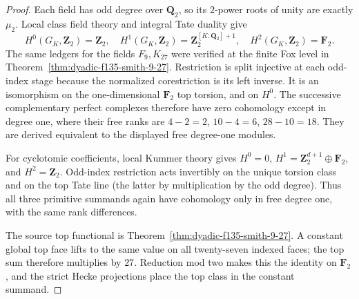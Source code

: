 \begin{proof}
Each field
has odd degree
over $\mathbf Q_2$,
so its
$2$-power roots
of unity are
exactly $\mu_2$.
Local class field
theory and
integral Tate
duality give
\[
H^0(G_K,\mathbf Z_2)=\mathbf Z_2,\quad
H^1(G_K,\mathbf Z_2)
=\mathbf Z_2^{[K:\mathbf Q_2]+1},\quad
H^2(G_K,\mathbf Z_2)=\mathbf F_2.
\]
The same ledgers
for the fields
$F_9,K_{27}$
were verified
at the finite
Fox level in
Theorem~\ref{thm:dyadic-f135-smith-9-27}.
Restriction is
split injective
at each odd-index
stage because
the normalized
corestriction
is its left inverse.
It is an
isomorphism
on the
one-dimensional
$\mathbf F_2$
top torsion,
and on $H^0$.
The successive
complementary
perfect complexes
therefore have
zero cohomology
except in degree
one, where their
free ranks are
$4-2=2$,
$10-4=6$,
$28-10=18$.
They are derived
equivalent to the
displayed free
degree-one modules.

For cyclotomic
coefficients,
local Kummer
theory gives
$H^0=0$,
$H^1=\mathbf Z_2^{d+1}
\oplus\mathbf F_2$,
and $H^2=\mathbf Z_2$.
Odd-index
restriction acts
invertibly on the
unique torsion
class and on
the top Tate line
(the latter by
multiplication by
the odd degree).
Thus all three
primitive
summands again
have cohomology
only in free
degree one,
with the same
rank differences.

The source
top functional
is
Theorem~\ref{thm:dyadic-f135-smith-9-27}.
A constant global
top face lifts
to the same
value on all
twenty-seven
indexed faces;
the top sum
therefore
multiplies by
$27$.
Reduction mod two
makes this the
identity on
$\mathbf F_2$,
and the
strict Hecke
projections
place the
top class in
the constant
summand.
\end{proof}

